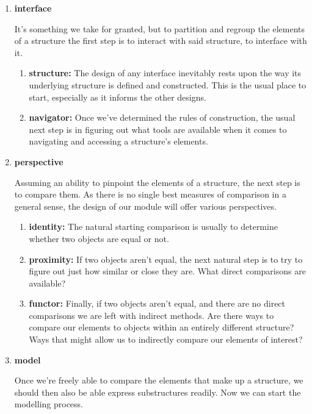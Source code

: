 \documentclass[twoside]{article}
\begin{document}
\begin{enumerate}
\item {\bfseries interface}

  It's something we take for granted, but to partition and regroup the elements of a structure the first step is
  to interact with said structure, to interface with it.

  \begin{enumerate}
    \item {\bfseries structure:} The design of any interface inevitably rests upon the way its underlying structure is defined
                                 and constructed. This is the usual place to start, especially as it informs the other designs.
    \item {\bfseries navigator:} Once we've determined the rules of construction, the usual next step is in figuring out
                                 what tools are available when it comes to navigating and accessing a structure's elements.
  \end{enumerate}
\item {\bfseries perspective}

  Assuming an ability to pinpoint the elements of a structure, the next step is to compare them. As there is no single
  best measures of comparison in a general sense, the design of our module will offer various perspectives.

  \begin{enumerate}
    \item {\bfseries identity:} The natural starting comparison is usually to determine whether two objects are equal or not.
    \item {\bfseries proximity:} If two objects aren't equal, the next natural step is to try to figure out just how similar
                                 or close they are. What direct comparisons are available?
    \item {\bfseries functor:} Finally, if two objects aren't equal, and there are no direct comparisons we are left with indirect
                               methods. Are there ways to compare our elements to objects within an entirely different structure?
                               Ways that might allow us to indirectly compare our elements of interest?
  \end{enumerate}
\item {\bfseries model}

  Once we're freely able to compare the elements that make up a structure, we should then also be able express substructures
  readily. Now we can start the modelling process.

\end{enumerate}
\end{document}
